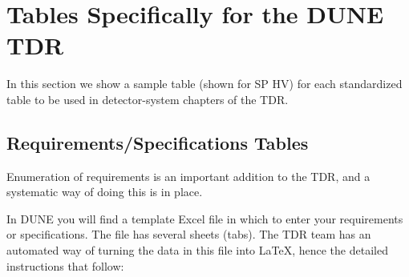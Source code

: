 \FloatBarrier

\section{Tables Specifically for the DUNE TDR}
\label{sec:tables}

In this section we show a sample table (shown for SP HV) for each standardized table to be used in detector-system chapters of the TDR. 

\subsection{Requirements/Specifications Tables}
\label{sec:tables-req}

Enumeration of requirements is an important addition to the TDR, and a systematic way of doing this is in place.  

In DUNE  you will find a template Excel file in which to enter your requirements or specifications.  The file has several sheets (tabs). The TDR team has an automated way of turning the data in this file into LaTeX, hence the detailed instructions that follow:

